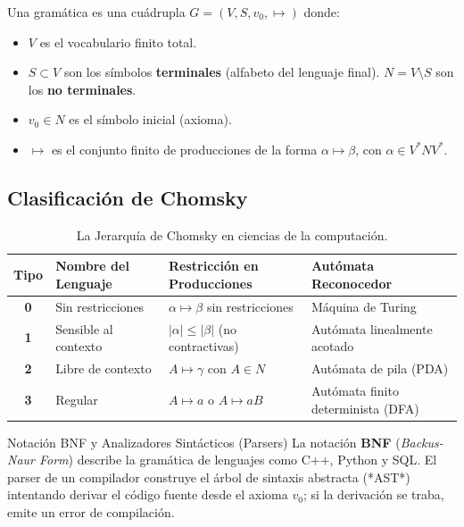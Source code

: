 \documentclass[11pt,a4paper]{article}
\begin{document}
\begin{definicion}
Una gramática es una cuádrupla $G = (V, S, v_0, \mapsto)$ donde:
\begin{itemize}[noitemsep]
  \item $V$ es el vocabulario finito total.
  \item $S \subset V$ son los símbolos \textbf{terminales} (alfabeto del lenguaje final). $N = V \setminus S$ son los \textbf{no terminales}.
  \item $v_0 \in N$ es el símbolo inicial (axioma).
  \item $\mapsto$ es el conjunto finito de producciones de la forma $\alpha \mapsto \beta$, con $\alpha \in V^* N V^*$.
\end{itemize}
\end{definicion}

\subsection{Clasificación de Chomsky}
\begin{table}[h!]
\centering
\small
\renewcommand{\arraystretch}{1.2}
\begin{tabularx}{\textwidth}{c l X l}
\toprule
\textbf{Tipo} & \textbf{Nombre del Lenguaje} & \textbf{Restricción en Producciones} & \textbf{Autómata Reconocedor} \\
\midrule
\textbf{0} & Sin restricciones & $\alpha \mapsto \beta$ sin restricciones & Máquina de Turing \\
\textbf{1} & Sensible al contexto & $|\alpha| \le |\beta|$ (no contractivas) & Autómata linealmente acotado \\
\textbf{2} & Libre de contexto & $A \mapsto \gamma$ con $A \in N$ & Autómata de pila (PDA) \\
\textbf{3} & Regular & $A \mapsto a$ o $A \mapsto aB$ & Autómata finito determinista (DFA) \\
\bottomrule
\end{tabularx}
\caption{La Jerarquía de Chomsky en ciencias de la computación.}
\end{table}

\begin{aplicacion}{Notación BNF y Analizadores Sintácticos (Parsers)}
La notación \textbf{BNF} (\textit{Backus-Naur Form}) describe la gramática de lenguajes como C++, Python y SQL. El parser de un compilador construye el árbol de sintaxis abstracta (*AST*) intentando derivar el código fuente desde el axioma $v_0$; si la derivación se traba, emite un error de compilación.
\end{aplicacion}
\end{document}
